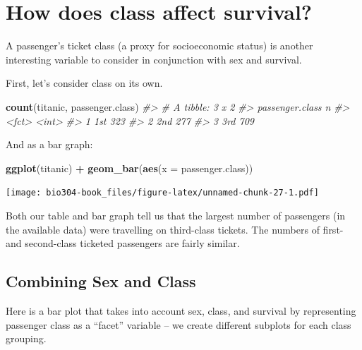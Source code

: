\documentclass[]{book}
\newenvironment{Shaded}{\begin{snugshade}}{\end{snugshade}}
\newcommand{\CommentTok}[1]{\textcolor[rgb]{0.56,0.35,0.01}{\textit{#1}}}
\newcommand{\DataTypeTok}[1]{\textcolor[rgb]{0.13,0.29,0.53}{#1}}
\newcommand{\KeywordTok}[1]{\textcolor[rgb]{0.13,0.29,0.53}{\textbf{#1}}}
\newcommand{\NormalTok}[1]{#1}
\newcommand{\OperatorTok}[1]{\textcolor[rgb]{0.81,0.36,0.00}{\textbf{#1}}}
\newcommand{\StringTok}[1]{\textcolor[rgb]{0.31,0.60,0.02}{#1}}
\theoremstyle{definition}
\theoremstyle{definition}
\theoremstyle{definition}
\theoremstyle{remark}
\begin{document}
\hypertarget{how-does-class-affect-survival}{%
\section{How does class affect
survival?}\label{how-does-class-affect-survival}}

A passenger's ticket class (a proxy for socioeconomic status) is another
interesting variable to consider in conjunction with sex and survival.

First, let's consider class on its own.

\begin{Shaded}
\begin{Highlighting}[]
\KeywordTok{count}\NormalTok{(titanic, passenger.class)}
\CommentTok{#> # A tibble: 3 x 2}
\CommentTok{#>   passenger.class     n}
\CommentTok{#>   <fct>           <int>}
\CommentTok{#> 1 1st               323}
\CommentTok{#> 2 2nd               277}
\CommentTok{#> 3 3rd               709}
\end{Highlighting}
\end{Shaded}

And as a bar graph:

\begin{Shaded}
\begin{Highlighting}[]
\KeywordTok{ggplot}\NormalTok{(titanic) }\OperatorTok{+}\StringTok{ }
\StringTok{  }\KeywordTok{geom_bar}\NormalTok{(}\KeywordTok{aes}\NormalTok{(}\DataTypeTok{x =}\NormalTok{ passenger.class))}
\end{Highlighting}
\end{Shaded}

\texttt{[image: bio304-book\_files/figure-latex/unnamed-chunk-27-1.pdf]}

Both our table and bar graph tell us that the largest number of
passengers (in the available data) were travelling on third-class
tickets. The numbers of first- and second-class ticketed passengers are
fairly similar.

\hypertarget{combining-sex-and-class}{%
\subsection{Combining Sex and Class}\label{combining-sex-and-class}}

Here is a bar plot that takes into account sex, class, and survival by
representing passenger class as a ``facet'' variable -- we create
different subplots for each class grouping.
\end{document}

